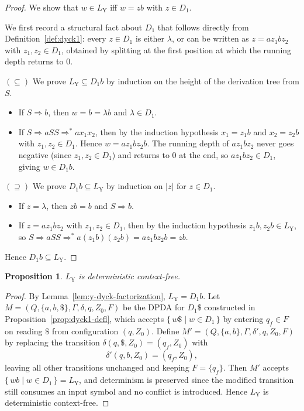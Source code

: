 \documentclass[11pt,a4paper]{article}
\newtheorem{proposition}[theorem]{Proposition}
\begin{document}
\begin{proof}
We show that $w\in L_{\mathrm{Y}}$ iff $w=zb$ with $z\in D_1$.

We first record a structural fact about $D_1$ that follows directly from
Definition~\ref{def:dyck1}: every $z\in D_1$ is either $\lambda$, or can
be written as $z=az_1bz_2$ with $z_1,z_2\in D_1$, obtained by splitting
at the first position at which the running depth returns to $0$.

\smallskip
\noindent$(\subseteq)$
We prove $L_{\mathrm{Y}}\subseteq D_1b$ by induction on the height of the
derivation tree from $S$.
\begin{itemize}
  \item If $S\Rightarrow b$, then $w=b=\lambda b$ and $\lambda\in D_1$.
  \item If $S\Rightarrow aSS\Rightarrow^* ax_1x_2$, then by the induction
        hypothesis $x_1=z_1b$ and $x_2=z_2b$ with $z_1,z_2\in D_1$.
        Hence $w=az_1bz_2b$.  The running depth of $az_1bz_2$ never goes
        negative (since $z_1,z_2\in D_1$) and returns to $0$ at the end,
        so $az_1bz_2\in D_1$, giving $w\in D_1b$.
\end{itemize}

\smallskip
\noindent$(\supseteq)$
We prove $D_1b\subseteq L_{\mathrm{Y}}$ by induction on $|z|$ for $z\in D_1$.
\begin{itemize}
  \item If $z=\lambda$, then $zb=b$ and $S\Rightarrow b$.
  \item If $z=az_1bz_2$ with $z_1,z_2\in D_1$, then by the induction
        hypothesis $z_1b,z_2b\in L_{\mathrm{Y}}$, so
        $S\Rightarrow aSS\Rightarrow^* a(z_1b)(z_2b)=az_1bz_2b=zb$.
\end{itemize}
Hence $D_1b\subseteq L_{\mathrm{Y}}$.
\end{proof}

\begin{proposition}\label{prop:y-cfl}
$L_{\mathrm{Y}}$ is deterministic context-free.
\end{proposition}

\begin{proof}
By Lemma~\ref{lem:y-dyck-factorization}, $L_{\mathrm{Y}}=D_1b$.
Let $M=(Q,\{a,b,\$\},\Gamma,\delta,q,Z_0,F)$ be the DPDA for $D_1\$$
constructed in Proposition~\ref{prop:dyck1-dcfl}, which accepts
$\{\,w\$\mid w\in D_1\,\}$ by entering $q_f\in F$ on reading $\$$ from
configuration $(q,Z_0)$.
Define $M'=(Q,\{a,b\},\Gamma,\delta',q,Z_0,F)$ by replacing the transition
$\delta(q,\$,Z_0)=(q_f,Z_0)$ with
\[
  \delta'(q,b,Z_0)=(q_f,Z_0),
\]
leaving all other transitions unchanged and keeping $F=\{q_f\}$.
Then $M'$ accepts $\{\,wb\mid w\in D_1\,\}=L_{\mathrm{Y}}$, and
determinism is preserved since the modified transition still consumes an
input symbol and no conflict is introduced.
Hence $L_{\mathrm{Y}}$ is deterministic context-free.
\end{proof}
\end{document}
